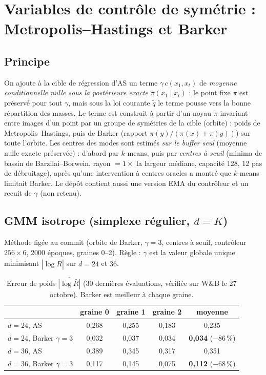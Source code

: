 \section{Variables de contrôle de symétrie : Metropolis--Hastings et Barker}
\label{sec:barker}

\subsection{Principe}
On ajoute à la cible de régression d'AS un terme $\gamma\,c(x_1,x_t)$ de \emph{moyenne conditionnelle nulle sous la postérieure exacte} $\tilde\pi(x_1\mid x_t)$ : le point fixe $\pi$ est préservé pour tout $\gamma$, mais sous la loi courante $\tilde q$ le terme pousse vers la bonne répartition des masses. Le terme est construit à partir d'un noyau $\tilde\pi$-invariant entre images d'un point par un groupe de symétries de la cible (orbite) : poids de Metropolis--Hastings, puis de Barker (rapport $\pi(y)/(\pi(x)+\pi(y))$) sur toute l'orbite. Les centres des modes sont estimés \emph{sur le buffer seul} (moyenne nulle exacte préservée) : d'abord par $k$-means, puis par \emph{centres à seuil} (minima de bassin de Barzilai--Borwein, rayon $=1\times$ la largeur médiane, capacité 128, 12 pas de débruitage), après qu'une intervention à centres oracles a montré que $k$-means limitait Barker. Le dépôt contient aussi une version EMA du contrôleur et un recuit de $\gamma$ (non retenu).

\subsection{GMM isotrope (simplexe régulier, $d=K$)}
Méthode figée au commit  (orbite de Barker, $\gamma=3$, centres à seuil, contrôleur $256\times6$, 2000 époques, graines 0--2). Règle : $\gamma$ est la valeur globale unique minimisant $\overline{|\log\bar R|}$ sur $d=24$ et $36$.

\begin{table}[h]\centering\small
\begin{tabular}{lcccc}\toprule
 & graine 0 & graine 1 & graine 2 & moyenne \\\midrule
$d=24$, AS & 0,268 & 0,255 & 0,183 & 0,235\\
$d=24$, Barker $\gamma=3$ & 0,032 & 0,037 & 0,034 & \textbf{0,034} ($-86\,\%$)\\
$d=36$, AS & 0,389 & 0,345 & 0,317 & 0,351\\
$d=36$, Barker $\gamma=3$ & 0,117 & 0,145 & 0,075 & \textbf{0,112} ($-68\,\%$)\\\bottomrule
\end{tabular}
\caption{Erreur de poids $\overline{|\log\bar R|}$ (30 dernières évaluations, vérifiée sur W\&B le 27 octobre). Barker est meilleur à chaque graine.}
\end{table}

